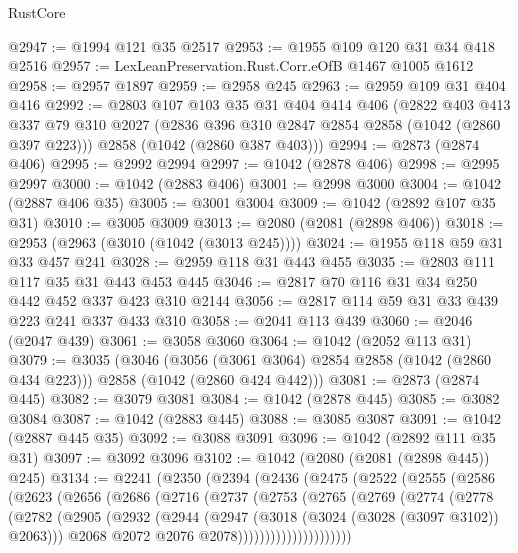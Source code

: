 \begin{lexlean}{RustCore}
\begin{coremodule}
@2947 := @1994 @121 @35 @2517
@2953 := @1955 @109 @120 @31 @34 @418 @2516
@2957 := LexLeanPreservation.Rust.Corr.eOfB @1467 @1005 @1612
@2958 := @2957 @1897
@2959 := @2958 @245
@2963 := @2959 @109 @31 @404 @416
@2992 := @2803
    @107
    @103
    @35
    @31
    @404
    @414
    @406
    (@2822
      @403
      @413
      @337
      @79
      @310
      @2027
      (@2836 @396 @310 @2847 @2854 @2858 (@1042 (@2860 @397 @223)))
      @2858
      (@1042 (@2860 @387 @403)))
@2994 := @2873 (@2874 @406)
@2995 := @2992 @2994
@2997 := @1042 (@2878 @406)
@2998 := @2995 @2997
@3000 := @1042 (@2883 @406)
@3001 := @2998 @3000
@3004 := @1042 (@2887 @406 @35)
@3005 := @3001 @3004
@3009 := @1042 (@2892 @107 @35 @31)
@3010 := @3005 @3009
@3013 := @2080 (@2081 (@2898 @406))
@3018 := @2953 (@2963 (@3010 (@1042 (@3013 @245))))
@3024 := @1955 @118 @59 @31 @33 @457 @241
@3028 := @2959 @118 @31 @443 @455
@3035 := @2803 @111 @117 @35 @31 @443 @453 @445
@3046 := @2817 @70 @116 @31 @34 @250 @442 @452 @337 @423 @310 @2144
@3056 := @2817 @114 @59 @31 @33 @439 @223 @241 @337 @433 @310
@3058 := @2041 @113 @439
@3060 := @2046 (@2047 @439)
@3061 := @3058 @3060
@3064 := @1042 (@2052 @113 @31)
@3079 := @3035
    (@3046
      (@3056 (@3061 @3064) @2854 @2858 (@1042 (@2860 @434 @223)))
      @2858
      (@1042 (@2860 @424 @442)))
@3081 := @2873 (@2874 @445)
@3082 := @3079 @3081
@3084 := @1042 (@2878 @445)
@3085 := @3082 @3084
@3087 := @1042 (@2883 @445)
@3088 := @3085 @3087
@3091 := @1042 (@2887 @445 @35)
@3092 := @3088 @3091
@3096 := @1042 (@2892 @111 @35 @31)
@3097 := @3092 @3096
@3102 := @1042 (@2080 (@2081 (@2898 @445)) @245)
@3134 := @2241
    (@2350
      (@2394
        (@2436
          (@2475
            (@2522
              (@2555
                (@2586
                  (@2623
                    (@2656
                      (@2686
                        (@2716
                          (@2737
                            (@2753
                              (@2765
                                (@2769
                                  (@2774
                                    (@2778
                                      (@2782
                                        (@2905
                                          (@2932
                                            (@2944
                                              (@2947 (@3018 (@3024 (@3028 (@3097 @3102)) @2063)))
                                              @2068
                                              @2072
                                              @2076
                                              @2078)))))))))))))))))))))

\end{coremodule}
\end{lexlean}
